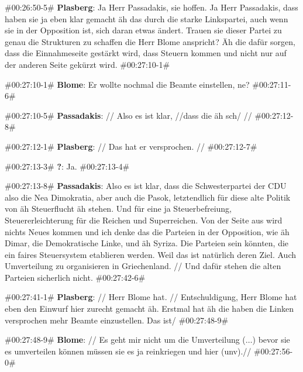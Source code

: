 \begin{description}
	\begin{linenumbers}[1]
		\item \#00:26:50-5\# \textbf{Plasberg}: Ja Herr Passadakis, sie hoffen. Ja Herr Passadakis, dass haben sie ja eben klar gemacht äh das durch die starke Linkspartei, auch wenn sie in der Opposition ist, sich daran etwas ändert. Trauen sie dieser Partei zu genau die Strukturen zu schaffen die Herr Blome anspricht? Äh die dafür sorgen, dass die Einnahmeseite gestärkt wird, dass Steuern kommen und nicht nur auf der anderen Seite gekürzt wird. \#00:27:10-1\#
		
		\item \#00:27:10-1\# \textbf{Blome}: Er wollte nochmal die Beamte einstellen, ne? \#00:27:11-6\#
		
		\item \#00:27:10-5\# \textbf{Passadakis}: // Also es ist klar, //dass die äh sch/ // \#00:27:12-8\#
		
		\item \#00:27:12-1\# \textbf{Plasberg}: // Das hat er versprochen. //  \#00:27:12-7\#
		
		\item \#00:27:13-3\# \textbf{?}: Ja. \#00:27:13-4\#
		
		\item \#00:27:13-8\# \textbf{Passadakis}: Also es ist klar, dass die Schwesterpartei der CDU also die Nea Dimokratia, aber auch die Pasok, letztendlich für diese alte Politik von äh Steuerflucht äh stehen. Und für eine ja Steuerbefreiung, Steuererleichterung für die Reichen und Superreichen. Von der Seite aus wird nichts Neues kommen und ich denke das die Parteien in der Opposition, wie äh Dimar, die Demokratische Linke, und äh Syriza. Die Parteien sein könnten, die ein faires Steuersystem etablieren werden. Weil das ist natürlich deren Ziel. Auch Umverteilung zu organisieren in Griechenland. // Und dafür stehen die alten Parteien sicherlich nicht. \#00:27:42-6\#
		
		\item \#00:27:41-1\# \textbf{Plasberg}: // Herr Blome hat. // Entschuldigung, Herr Blome hat eben den Einwurf hier zurecht gemacht äh. Erstmal hat äh die haben die Linken versprochen mehr Beamte einzustellen. Das ist/ \#00:27:48-9\#
		
		\item \#00:27:48-9\# \textbf{Blome}: // Es geht mir nicht um die Umverteilung ($\ldots$) bevor sie es umverteilen können müssen sie es ja reinkriegen  und hier (unv).// \#00:27:56-0\#
		

\end{linenumbers}
\end{description}
